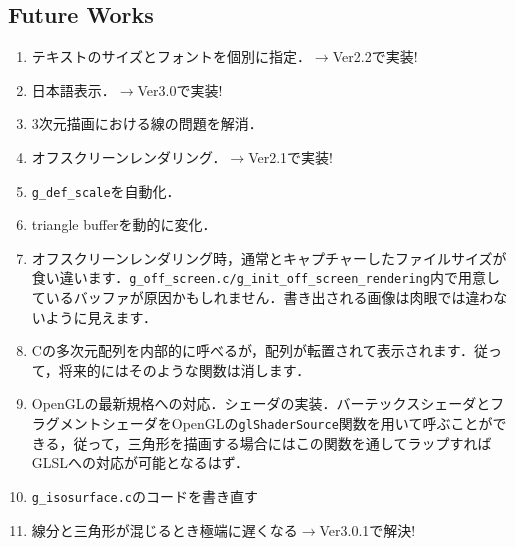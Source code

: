 \documentclass[platex,a4paper,12pt]{jsarticle}%
\begin{document}
\subsection{Future Works}
\begin{enumerate}
\item テキストのサイズとフォントを個別に指定．$\rightarrow$Ver2.2で実装!
\item 日本語表示．$\rightarrow$Ver3.0で実装!
\item 3次元描画における線の問題を解消．
\item オフスクリーンレンダリング．$\rightarrow$Ver2.1で実装!
\item \verb|g_def_scale|を自動化．
\item triangle bufferを動的に変化．
\item オフスクリーンレンダリング時，通常とキャプチャーしたファイルサイズが食い違います．\verb|g_off_screen.c/g_init_off_screen_rendering|内で用意しているバッファが原因かもしれません．書き出される画像は肉眼では違わないように見えます．
\item Cの多次元配列を内部的に呼べるが，配列が転置されて表示されます．従って，将来的にはそのような関数は消します．
\item OpenGLの最新規格への対応．シェーダの実装．バーテックスシェーダとフラグメントシェーダをOpenGLの\verb|glShaderSource|関数を用いて呼ぶことができる，従って，三角形を描画する場合にはこの関数を通してラップすればGLSLへの対応が可能となるはず．
\item \verb|g_isosurface.c|のコードを書き直す
\item 線分と三角形が混じるとき極端に遅くなる$\rightarrow$Ver3.0.1で解決!
\end{enumerate}
\end{document}
